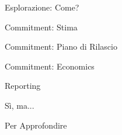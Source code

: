 \documentclass[compress, red, 14pt]{beamer}
\begin{document}
	\begin{frame}{Esplorazione: Come?}
	\end{frame}

	\begin{frame}{Commitment: Stima}
	\end{frame}

	\begin{frame}{Commitment: Piano di Rilascio}
	\end{frame}
	
	\begin{frame}{Commitment: Economics}
	\end{frame}
	
	\begin{frame}{Reporting}
	\end{frame}
	
	\begin{frame}{Sì, ma...}
	\end{frame}
	
	\begin{frame}{Per Approfondire}
	\end{frame}
\end{document}
